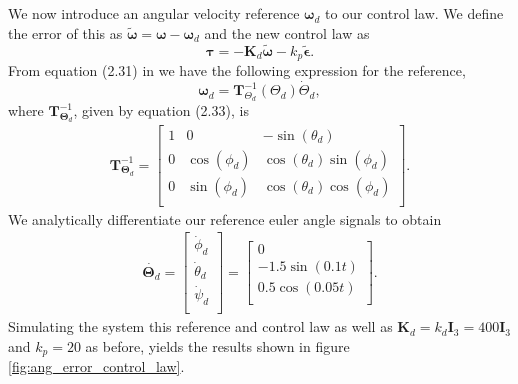\subsection{}
We now introduce an angular velocity reference $\boldsymbol{\omega}_d$ to our control law. We define the error of this as $\tilde{\boldsymbol{ \omega}} =\boldsymbol{\omega} - \boldsymbol{\omega}_d$ and the new control law as
\begin{equation}
\label{eq:control_law_ang_error}
	\boldsymbol{\tau} = -\mathbf{K}_d \tilde{\boldsymbol{\omega}} - k_p \tilde{\boldsymbol{\epsilon}}.
\end{equation}
From equation (2.31) in \cite{Fossen2011} we have the following expression for the reference,
\begin{equation}
	\boldsymbol{\omega}_d = \mathbf{T}^{-1}_{\Theta_d}(\Theta_d)\dot{\Theta}_d,
\end{equation}
where $\mathbf{T}^{-1}_{\boldsymbol{\Theta}_d}$, given by equation (2.33), is
\begin{equation}\begin{aligned}
\mathbf{T}^{-1}_{\boldsymbol{\Theta}_d} =
\begin{bmatrix}
1 & 0 & -\sin(\theta_d) \\
0 & \cos(\phi_d) & \cos(\theta_d)\sin(\phi_d) \\
0 & \sin(\phi_d) & \cos(\theta_d)\cos(\phi_d) \\
\end{bmatrix}.
\end{aligned}\end{equation}
We analytically differentiate our reference euler angle signals to obtain
\begin{equation}\begin{aligned}
\dot{\boldsymbol{\Theta}_d} =
\begin{bmatrix}
\dot \phi_d\\
\dot \theta_d\\
\dot \psi_d \\
\end{bmatrix} =
\begin{bmatrix}
0\\
-1.5 \sin(0.1t)\\
0.5 \cos(0.05t)\\
\end{bmatrix}.
\end{aligned}\end{equation}
Simulating the system this reference and control law as well as $\mathbf{K}_d = k_d \mathbf{I}_3 = 400 \mathbf{I}_3$ and $k_p = 20$ as before, yields the results shown in figure \ref{fig:ang_error_control_law}.
